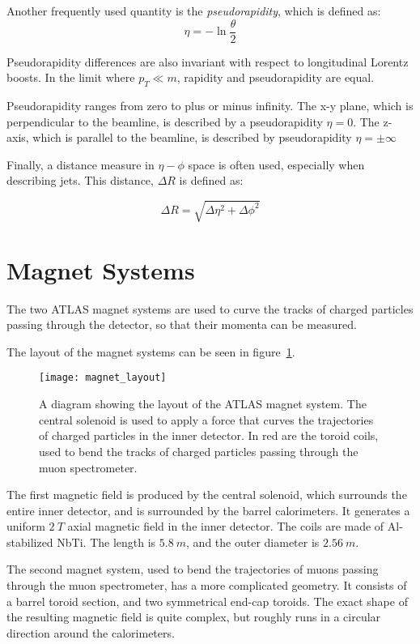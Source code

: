 Another frequently used quantity is the
\textit{pseudorapidity}, which is defined as:
\begin{equation}
\eta = -\ln\frac{\theta}{2}
\end{equation}

Pseudorapidity differences are also invariant with respect to
longitudinal Lorentz boosts. In the limit where $p_T \ll m$, rapidity and
pseudorapidity are equal.

Pseudorapidity ranges from zero to plus or minus infinity.
The x-y plane, which is perpendicular to the beamline, is described by a pseudorapidity $\eta=0$.
The z-axis, which is parallel to the beamline, is described by pseudorapidity $\eta=\pm\infty$

Finally, a distance measure in $\eta-\phi$ space is often used, especially when describing jets.
This distance, $\Delta R$ is defined as:

\begin{equation}
\Delta R = \sqrt{\Delta\eta^2+\Delta\phi^2}
\end{equation}

\section{Magnet Systems}\label{sec:magnet_systems}
The two ATLAS magnet systems are used to curve the tracks of charged particles passing through the detector,
so that their momenta can be measured.

The layout of the magnet systems can be seen in figure~\ref{fig:magnet_layout}.

\begin{figure}[!htbp]
\texttt{[image: magnet\_layout]}
\caption{A diagram showing the layout of the ATLAS magnet system.
The central solenoid is used to apply a force that curves the trajectories of charged particles in the inner detector.
In red are the toroid coils, used to bend the tracks of charged particles passing through the muon spectrometer.}
\label{fig:magnet_layout}
\end{figure}

The first magnetic field is produced by the central solenoid, which surrounds the entire inner detector,
and is surrounded by the barrel calorimeters.
It generates a uniform $2~T$ axial magnetic field in the inner detector.
The coils are made of Al-stabilized NbTi. The length is $5.8~m$, and the outer diameter is $2.56~m$\cite{atlas-detector-2008}.

The second magnet system, used to bend the trajectories of muons passing through the muon spectrometer,
has a more complicated geometry.
It consists of a barrel toroid section, and two symmetrical end-cap toroids.
The exact shape of the resulting magnetic field is quite complex,
but roughly runs in a circular direction around the calorimeters.

